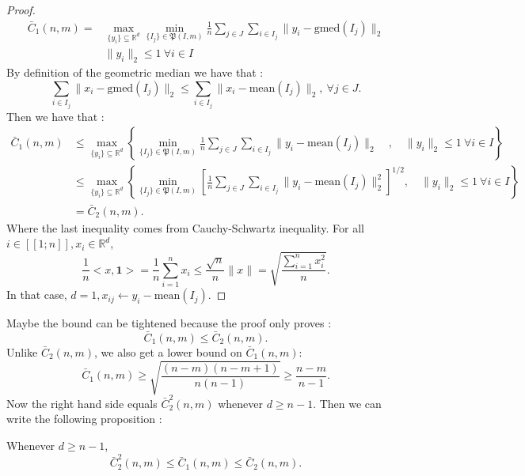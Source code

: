 \documentclass{amsart}
\newcommand{\RR}{\mathbb{R}}
\begin{document}
\begin{proof}
    \begin{align*}\bar{C}_1\left(n,m\right)=&
        \max_{\{y_i\}\subseteq\RR^d}\min_{\{I_j\}\in\mathfrak{P}\left(I,m\right)}\frac{1}{n}\sum_{j\in J}\sum_{i\in I_j}\lVert y_i-\text{gmed}\left(I_j\right)\rVert_2 \\ &\lVert y_i\rVert_2\leq1 \:\forall i\in I
    \end{align*}
    By definition of the geometric median we have that : $$\sum_{i\in I_j}\lVert x_i-\text{gmed}(I_j)\rVert_2\leq \sum_{i\in I_j}\lVert x_i-\text{mean}(I_j)\rVert_2, \: \forall j\in J.$$ 
    Then we have that :
    \begin{align*}
        \bar{C}_1\left(n,m\right)&\leq
        \max_{\{y_i\}\subseteq\RR^d}\left\{\min_{\{I_j\}\in\mathfrak{P}\left(I,m\right)}\frac{1}{n}\sum_{j\in J}\sum_{i\in I_j}\lVert y_i-\text{mean}\left(I_j\right)\rVert_2\quad,\quad \lVert y_i\rVert_2\leq1 \:\forall i\in I  \right\}\\ 
        &\leq\max_{\{y_i\}\subseteq\RR^d}\left\{\min_{\{I_j\}\in\mathfrak{P}\left(I,m\right)}\left[\frac{1}{n}\sum_{j\in J}\sum_{i\in I_j}\lVert y_i-\text{mean}\left(I_j\right)\rVert_2^2\right]^{1/2}, \quad\lVert y_i\rVert_2\leq1 \:\forall i\in I\right\} \\
        &=\bar{C}_2\left(n,m\right).
    \end{align*}
    Where the last inequality comes from Cauchy-Schwartz inequality. For all $i\in[\![1;n]\!], x_i\in\RR^d$, 
    $$
    \frac{1}{n}<x,\mathbf{1}>=\frac{1}{n}\sum_{i=1}^nx_i \leq \frac{\sqrt{n}}{n}\lVert x\rVert=\sqrt{\frac{\sum_{i=1}^nx_i^2}{n}}.
    $$
    In that case, $d=1, x_{ij}\gets y_i-\text{mean}\left(I_j\right)$.
\end{proof}
Maybe the bound can be tightened because the proof only proves : $$\bar{C}_1\left(n,m \right)\leq\bar{C}_2\left(n,m \right).$$
Unlike $\bar{C}_2\left(n,m \right)$, we also get a lower bound on $\bar{C}_1\left(n,m \right)$: $$\bar{C}_1\left(n,m \right)\geq\sqrt{\frac{(n-m)(n-m+1)}{n(n-1)}}\geq \frac{n-m}{n-1}.$$
Now the right hand side equals $\bar{C}_2^2(n,m)$ whenever $d\geq n-1$. Then we can write the following proposition :
\begin{proposition}Whenever $d\geq n-1$,  
$$\bar{C}_2^2\left(n,m \right)\leq \bar{C}_1\left(n,m \right)\leq\bar{C}_2\left(n,m \right).$$
\end{proposition}
\end{document}
